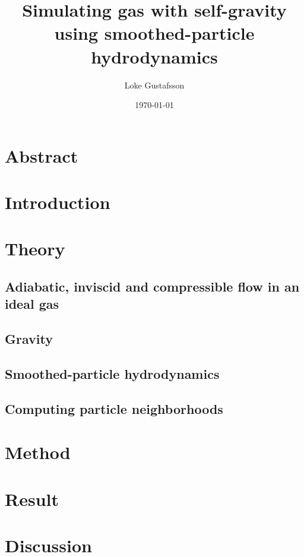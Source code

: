 \documentclass{report}
\title{
Simulating gas with self-gravity using smoothed-particle hydrodynamics
}
\subtitle{}
\author{Loke Gustafsson}
\date{\today}
\begin{document}
\begin{spacing}{1.5}



\chapter*{Abstract}
    

\tableofcontents

\chapter{Introduction}
    

\chapter{Theory}
    \section{Adiabatic, inviscid and compressible flow in an ideal gas}
    

    \section{Gravity}
    

    \section{Smoothed-particle hydrodynamics}
    

    \section{Computing particle neighborhoods}
    

\chapter{Method}
    

\chapter{Result}
    

\chapter{Discussion}
    

\printbibliography[heading=bibintoc,title={References}]

\end{spacing}
\end{document}
